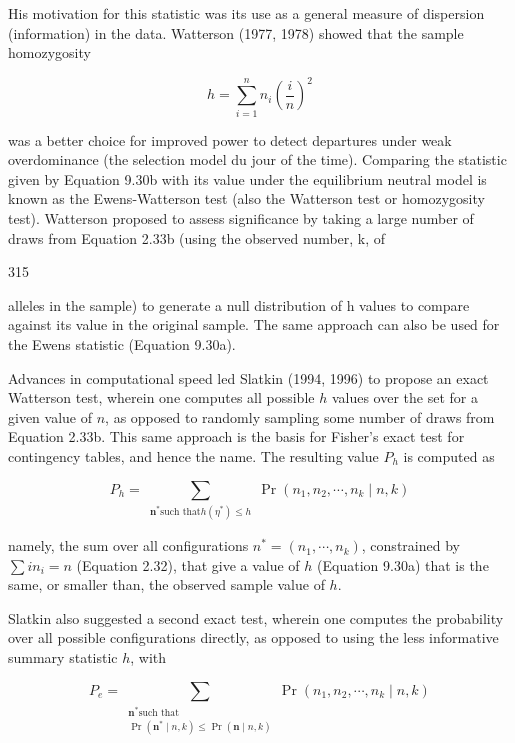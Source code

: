 \documentclass{article}
\begin{document}
His motivation for this statistic was its use as a general measure of dispersion (information) in the data. Watterson (1977, 1978) showed that the sample homozygosity

\begin{equation}
h=\sum_{i=1}^{n}n_{i}\left(\frac{i}{n}\right)^{2}
\tag{9.30b}
\label{eq:9_30b}
\end{equation}

was a better choice for improved power to detect departures under weak overdominance (the selection model du jour of the time). Comparing the statistic given by Equation 9.30b with its value under the equilibrium neutral model is known as the Ewens-Watterson test (also the Watterson test or homozygosity test). Watterson proposed to assess significance by taking a large number of draws from Equation 2.33b (using the observed number, k, of

315

alleles in the sample) to generate a null distribution of h values to compare against its value in the original sample. The same approach can also be used for the Ewens statistic (Equation 9.30a).

Advances in computational speed led Slatkin (1994, 1996) to propose an exact Watterson test, wherein one computes all possible $h$ values over the set for a given value of $n$, as opposed to randomly sampling some number of draws from Equation 2.33b. This same approach is the basis for Fisher's exact test for contingency tables, and hence the name. The resulting value $P_{h}$ is computed as

\begin{equation}
P_{h}=\sum_{\substack{\boldsymbol{n}^{*}\text{such that}h(\eta^{*})\leq h}}\operatorname{Pr}(n_{1},n_{2},\cdots,n_{k}\mid n,k)
\tag{9.31a}
\label{eq:9_31a}
\end{equation}

namely, the sum over all configurations  $ n^* = (n_1, \cdots, n_k) $, constrained by  $ \sum i n_i = n $ (Equation 2.32), that give a value of  $ h $ (Equation 9.30a) that is the same, or smaller than, the observed sample value of  $ h $.

Slatkin also suggested a second exact test, wherein one computes the probability over all possible configurations directly, as opposed to using the less informative summary statistic  $ h $, with

\begin{equation}
P_{e}=\sum_{\substack{\mathbf{n}^{*}\text{such that}\\ \Pr(\mathbf{n}^{*}\mid n,k)\leq\Pr(\mathbf{n}\mid n,k)}}\Pr(n_{1},n_{2},\cdots,n_{k}\mid n,k)
\tag{9.31b}
\label{eq:9_31b}
\end{equation}
\end{document}
